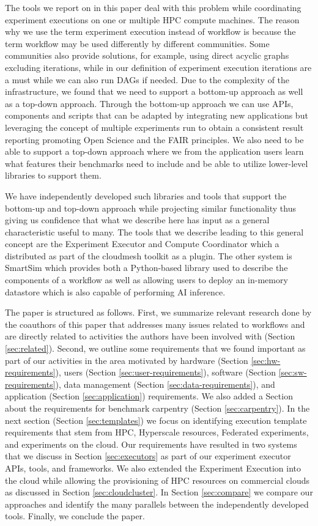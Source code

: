 \documentclass[utf8]{FrontiersinVancouver} %
\begin{document}
The tools we report on in this paper deal with this problem while coordinating experiment executions on one or multiple HPC compute machines. The reason why we use the term experiment execution instead of workflow is because the term workflow may be used differently by different communities. Some communities also provide solutions, for example, using direct acyclic graphs excluding iterations, while in our definition of experiment execution iterations are a must while we can also run DAGs if needed. Due to the complexity of the infrastructure, we found that we need to support a bottom-up approach as well as a top-down approach. Through the bottom-up approach we can use APIs, components and scripts that can be adapted by integrating new applications but leveraging the concept of multiple experiments run to obtain a consistent result reporting promoting Open Science and the FAIR principles. We also need to be able to support a top-down approach where we from the application users learn what features their benchmarks need to include and be able to utilize lower-level libraries to support them.

We have independently developed such libraries and tools that support the bottom-up and top-down approach while projecting similar functionality thus giving us confidence that what we describe here has input as a general characteristic useful to many. The tools that we describe leading to this general concept are the Experiment Executor and Compute Coordinator which a distributed as part of the cloudmesh toolkit as a plugin. The other system is SmartSim which provides both a Python-based library used to describe the components of a workflow as well as allowing users to deploy an in-memory datastore which is also capable of performing AI inference. 

The paper is structured as follows. First, we summarize relevant research done by the coauthors of this paper that addresses many issues related to workflows and are directly related to activities the authors have been involved with (Section \ref{sec:related}).
Second, we outline some requirements that we found important as part of our activities in the area motivated by hardware (Section \ref{sec:hw-requirements}), users (Section \ref{sec:user-requirements}), software (Section \ref{sec:sw-requirements}), data management (Section \ref{sec:data-requirements}), and application (Section \ref{sec:application}) requirements. We also added a Section about the requirements for benchmark carpentry (Section \ref{sec:carpentry}). In the next section (Section \ref{sec:templates}) we focus on identifying execution template requirements that stem from HPC, Hyperscale resources, Federated experiments, and experiments on the cloud.
Our requirements have resulted in two systems that we discuss in Section \ref{sec:executors} as part of our experiment executor APIs, tools, and frameworks.
We also extended the Experiment Execution into the cloud while allowing the provisioning of HPC resources on commercial clouds as discussed in Section \ref{sec:cloudcluster}.
In Section \ref{sec:compare} we compare our approaches and identify the many parallels between the independently developed tools. Finally, we conclude the paper.
\end{document}
